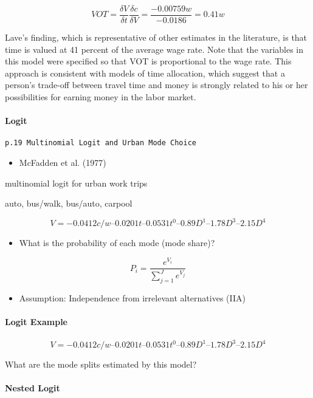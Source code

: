 \documentclass[]{article}
\providecommand{\tightlist}{%
  \setlength{\itemsep}{0pt}\setlength{\parskip}{0pt}}
\let\oldparagraph\paragraph
\renewcommand{\paragraph}[1]{\oldparagraph{#1}\mbox{}}
\begin{document}
\[VOT =\frac{\delta V}{\delta t}\frac{\delta c}{\delta V}=\frac{-0.00759w}{-0.0186} = 0.41w\]

Lave's finding, which is representative of other estimates in the
literature, is that time is valued at 41 percent of the average wage
rate. Note that the variables in this model were specified so that VOT
is proportional to the wage rate. This approach is consistent with
models of time allocation, which suggest that a person's trade-off
between travel time and money is strongly related to his or her
possibilities for earning money in the labor market.

\hypertarget{logit}{%
\paragraph{Logit}\label{logit}}

\texttt{p.19\ Multinomial\ Logit\ and\ Urban\ Mode\ Choice}

\begin{itemize}
\tightlist
\item
  McFadden et al. (1977)
\end{itemize}

multinomial logit for urban work trips

auto, bus/walk, bus/auto, carpool

\[V = -0.0412c/w – 0.0201t – 0.0531t^0 – 0.89 D^1 – 1.78 D^3 – 2.15 D^4\]

\begin{itemize}
\tightlist
\item
  What is the probability of each mode (mode share)?
\end{itemize}

\[P_i=\frac{e^{V_i}}{\sum_{j=1}^Je^{V_j}}\]

\begin{itemize}
\tightlist
\item
  Assumption: Independence from irrelevant alternatives (IIA)
\end{itemize}

\hypertarget{logit-example}{%
\paragraph{Logit Example}\label{logit-example}}

\[V = -0.0412c/w – 0.0201t – 0.0531t^0 – 0.89 D^1 – 1.78 D^3 – 2.15 D^4\]

What are the mode splits estimated by this model?

\hypertarget{nested-logit}{%
\paragraph{Nested Logit}\label{nested-logit}}
\end{document}
